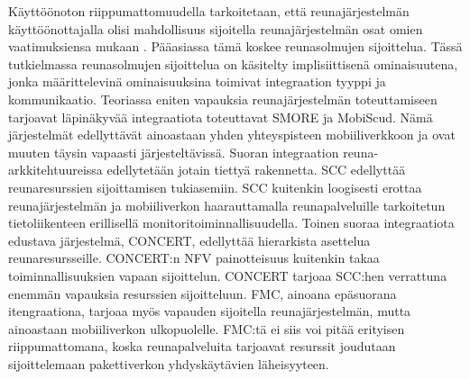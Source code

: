 Käyttöönoton riippumattomuudella tarkoitetaan, että reunajärjestelmän käyttöönottajalla olisi mahdollisuus sijoitella reunajärjestelmän osat omien vaatimuksiensa mukaan \cite{etsitechreq}. Pääasiassa tämä koskee reunasolmujen sijoittelua. Tässä tutkielmassa reunasolmujen sijoittelua on käsitelty implisiittisenä ominaisuutena, jonka määrittelevinä ominaisuuksina toimivat integraation tyyppi ja kommunikaatio. 
Teoriassa eniten vapauksia reunajärjestelmän toteuttamiseen tarjoavat läpinäkyvää integraatiota toteuttavat SMORE ja MobiScud.
Nämä järjestelmät edellyttävät ainoastaan yhden yhteyspisteen mobiiliverkkoon ja ovat muuten täysin vapaasti järjesteltävissä.
Suoran integraation reuna-arkkitehtuureissa edellytetään jotain tiettyä rakennetta. 
SCC edellyttää reunaresurssien sijoittamisen tukiasemiin. SCC kuitenkin loogisesti erottaa reunajärjestelmän ja mobiiliverkon haarauttamalla reunapalveluille tarkoitetun tietoliikenteen erillisellä monitoritoiminnallisuudella.
Toinen suoraa integraatiota edustava järjestelmä, CONCERT, edellyttää hierarkista asettelua reunaresursseille. CONCERT:n NFV painotteisuus kuitenkin takaa toiminnallisuuksien vapaan sijoittelun. CONCERT tarjoaa SCC:hen verrattuna enemmän vapauksia resurssien sijoitteluun.
FMC, ainoana epäsuorana itengraationa, tarjoaa myös vapauden sijoitella reunajärjestelmän, mutta ainoastaan mobiiliverkon ulkopuolelle.
FMC:tä ei siis voi pitää erityisen riippumattomana, koska reunapalveluita tarjoavat resurssit joudutaan sijoittelemaan pakettiverkon yhdyskäytävien läheisyyteen.

